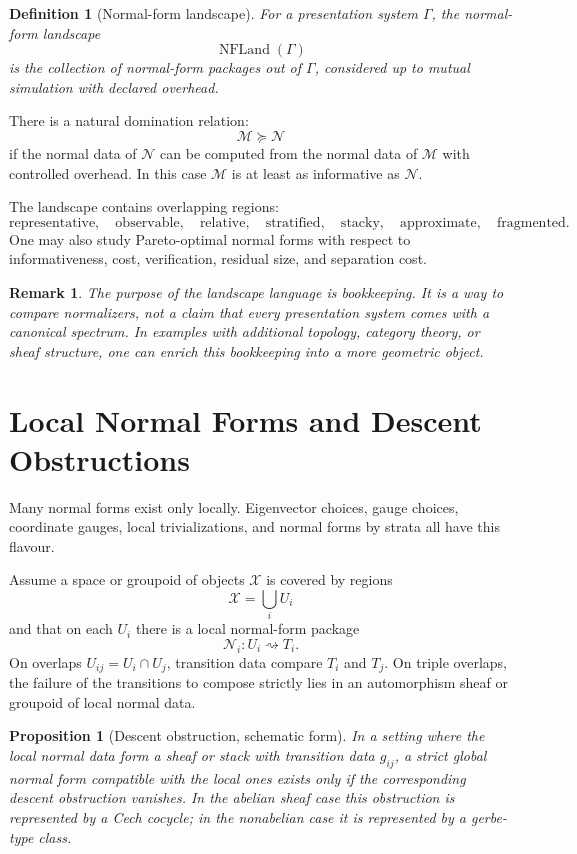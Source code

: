 \documentclass[11pt]{article}
\newtheorem{proposition}[theorem]{Proposition}
\newtheorem{definition}[theorem]{Definition}
\newtheorem{remark}[theorem]{Remark}
\begin{document}
\begin{definition}[Normal-form landscape]
For a presentation system \(\Gamma\), the normal-form landscape
\[
\operatorname{NFLand}(\Gamma)
\]
is the collection of normal-form packages out of \(\Gamma\), considered up to mutual simulation with declared overhead.
\end{definition}

There is a natural domination relation:
\[
\mathcal M\succeq \mathcal N
\]
if the normal data of \(\mathcal N\) can be computed from the normal data of \(\mathcal M\) with controlled overhead. In this case \(\mathcal M\) is at least as informative as \(\mathcal N\).

The landscape contains overlapping regions:
\[
\text{representative},\quad
\text{observable},\quad
\text{relative},\quad
\text{stratified},\quad
\text{stacky},\quad
\text{approximate},\quad
\text{fragmented}.
\]
One may also study Pareto-optimal normal forms with respect to informativeness, cost, verification, residual size, and separation cost.

\begin{remark}
The purpose of the landscape language is bookkeeping. It is a way to compare normalizers, not a claim that every presentation system comes with a canonical spectrum. In examples with additional topology, category theory, or sheaf structure, one can enrich this bookkeeping into a more geometric object.
\end{remark}

\section{Local Normal Forms and Descent Obstructions}

Many normal forms exist only locally. Eigenvector choices, gauge choices, coordinate gauges, local trivializations, and normal forms by strata all have this flavour.

Assume a space or groupoid of objects \(\mathcal X\) is covered by regions
\[
\mathcal X=\bigcup_i U_i
\]
and that on each \(U_i\) there is a local normal-form package
\[
\mathcal N_i:U_i\rightsquigarrow T_i.
\]
On overlaps \(U_{ij}=U_i\cap U_j\), transition data compare \(T_i\) and \(T_j\). On triple overlaps, the failure of the transitions to compose strictly lies in an automorphism sheaf or groupoid of local normal data.

\begin{proposition}[Descent obstruction, schematic form]
In a setting where the local normal data form a sheaf or stack with transition data \(g_{ij}\), a strict global normal form compatible with the local ones exists only if the corresponding descent obstruction vanishes. In the abelian sheaf case this obstruction is represented by a Cech cocycle; in the nonabelian case it is represented by a gerbe-type class.
\end{proposition}
\end{document}
